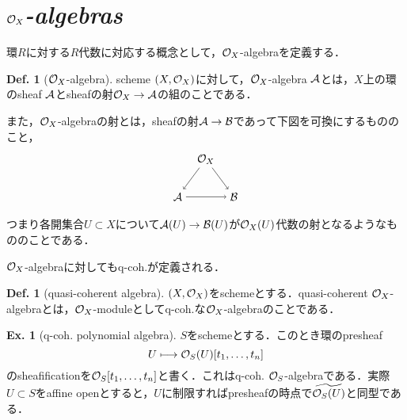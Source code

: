 \documentclass[dvipdfmx,b5paper,papersize]{jsarticle}
\theoremstyle{definition}
\newtheorem{defi}[thm]{Def.}
\newtheorem{ex}[thm]{Ex.}
\begin{document}
\section{${\cal{O}}_{X}$\it{-algebras}}
環$R$に対する$R$代数に対応する概念として，${\cal{O}}_{X}$-algebraを定義する．
\begin{defi}[${\cal{O}}_X$-algebra]
  scheme $(X,{\cal{O}}_X)$に対して，${\cal{O}}_X$-algebra $\cal{A}$とは，$X$上の環のsheaf $\cal{A}$とsheafの射${\cal{O}}_X \to \cal{A}$の組のことである．

  また，${\cal{O}}_X$-algebraの射とは，sheafの射$\cal{A} \to \cal{B}$であって下図を可換にするもののこと，
  \[
    \begin{tikzpicture}[auto,->]
      \node (a) at (0.9,1.2) {${\cal{O}}_X$};
      \node (b) at (0,0) {$\cal{A}$}; \node (y) at (1.8,0) {$\cal{B}$};


      \draw (a) -- node[swap] {$\scriptstyle $} (b);
      \draw (a) -- node[swap] {$\scriptstyle $} (y);
      \draw (b) -- node[swap] {$\scriptstyle $} (y);
  \end{tikzpicture}
  \]

  つまり各開集合$U \subset X$について${\cal{A}}(U) \to {\cal{B}}(U)$が${{\cal{O}}_X}(U)$代数の射となるようなもののことである．
\end{defi}
${\cal{O}}_X$-algebraに対してもq-coh.が定義される．
\begin{defi}[quasi-coherent algebra]
  $(X,{\cal{O}}_X)$をschemeとする．quasi-coherent ${\cal{O}}_X$-algebraとは，${\cal{O}}_X$-moduleとしてq-coh.な${\cal{O}}_X$-algebraのことである．

\end{defi}

\begin{ex}[q-coh. polynomial algebra]
  $S$をschemeとする．このとき環のpresheaf
  \[
    U \longmapsto {\cal{O}}_S(U)[t_1,\dots ,t_n]
  \]
  のsheafificationを${\cal{O}}_S[t_1,\dots ,t_n]$と書く．これはq-coh. ${\cal{O}}_S$-algebraである．実際$U \subset S$をaffine openとすると，$U$に制限すればpresheafの時点で${\widetilde{{\cal{O}}_S(U)}}$と同型である．
\end{ex}
\end{document}
